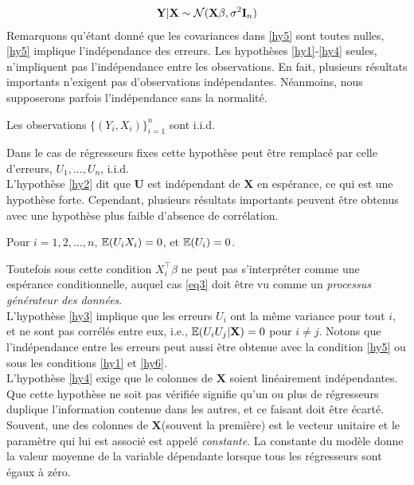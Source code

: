 \begin{align*}
\mathbf{Y}|\mathbf{X} \sim\mathcal{N}(\mathbf{X}\beta, \sigma^2\mathbf{I}_n)
\end{align*}
Remarquons qu'étant donné que les covariances dans \ref{hy5} sont toutes nulles,  \ref{hy5} implique l'indépendance des erreurs. Les hypothèses \ref{hy1}-\ref{hy4} seules, n'impliquent pas l'indépendance entre les observations. En fait, plusieurs résultats importants n'exigent pas d'observations indépendantes. Néanmoins, nous supposerons parfois l'indépendance  sans la normalité.
\begin{assumption}
Les observations $\{(Y_i, X_i)\}_{i=1}^n$ sont i.i.d.
\label{hy6}
\end{assumption}
Dans le cas de régresseurs fixes cette hypothèse peut être remplacé par celle d'erreurs, $U_1, ..., U_n$, i.i.d.\\
L'hypothèse \ref{hy2} dit que $\mathbf{U}$ est indépendant de $\mathbf{X}$ en espérance, ce qui est une hypothèse forte. Cependant, plusieurs résultats importants peuvent être obtenus avec une hypothèse plus faible  d'absence de corrélation.
\begin{assumption}
Pour $i=1,2,...,n$, $\mathbb{E}(U_iX_i)=0$, et $\mathbb{E}(U_i)=0$.
\label{hy7}
\end{assumption}
Toutefois sous cette condition $X_i^\top\beta$ ne peut pas s'interpréter comme une espérance conditionnelle, auquel cas \eqref{eq3} doit être vu comme un \emph{processus générateur des données}.\\
L'hypothèse \ref{hy3} implique que les erreurs $U_i$ ont la même variance pour tout $i$, et ne sont pas corrélés entre eux, i.e., $\mathbb{E}(U_iU_j| \mathbf{X}) = 0$ pour $i\neq j$. Notons que l'indépendance entre les erreurs peut aussi être obtenue avec la condition \ref{hy5} ou sous les  conditions \ref{hy1} et \ref{hy6}.\\
L'hypothèse \ref{hy4} exige que le colonnes de $\mathbf{X}$ soient linéairement indépendantes. Que cette hypothèse ne soit pas vérifiée signifie qu'un ou plus de régresseurs duplique l'information contenue dans les autres, et ce faisant doit être écarté.\\
Souvent, une des colonnes de $\mathbf{X}$(souvent la première) est le vecteur unitaire et le paramètre qui lui est associé est appelé \emph{constante}. La constante du modèle donne la valeur moyenne de la variable dépendante lorsque tous les régresseurs sont égaux à zéro.

